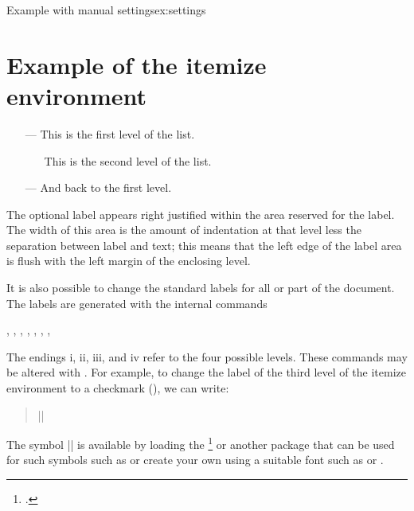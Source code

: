 \begin{texexample}{Example with manual settings}{ex:settings}
\section{Example of the itemize environment}
\begin{itemize}
\item[---] This is the first level of the list.
  \begin{itemize}
     \item[\textbullet] This is the second level of the list.
  \end{itemize}
\item[---] And back to the first level.
\end{itemize}
\end{texexample}

The optional label appears right justified within the area reserved for
the label. The width of this area is the amount of indentation at that level
less the separation between label and text; this means that the left edge
of the label area is flush with the left margin of the enclosing level.

It is also possible to change the standard labels for all or part of the
document. The labels are generated with the internal commands

\bgroup
\trivlist\item
{}, , , , 
, , , 
\endtrivlist
\egroup

The endings i, ii, iii, and iv refer to the four possible levels.
These commands may be altered with . For example,
to change the label of the third level of the itemize environment to a checkmark (), we can write:



\begin{quote}\small
|\renewcommand{\labelitemiii}{\ding{51}}|
\end{quote}

The symbol || is available by loading the \footcite{pifont} or another package that can be used for such symbols such as  or create your own using a suitable font such as 
or . 

